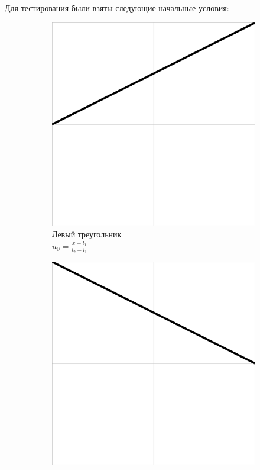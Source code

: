 \documentclass[12pt, a4paper]{article}
\begin{document}
Для тестирования были взяты следующие начальные условия:
\begin{figure}[!hp]
	\centering
	\begin{subfigure}[t]{0.32\textwidth}
		\centering
		\includegraphics[width=\textwidth]{test1}
		\caption{Левый треугольник \\ $u_0 = \frac{x-l_1}{l_2-l_1}$}
		\label{test1}
	\end{subfigure}
	\hfill
	\begin{subfigure}[t]{0.32\textwidth}
		\centering
		\includegraphics[width=\textwidth]{test2}

\end{subfigure}
\end{figure}
\end{document}
